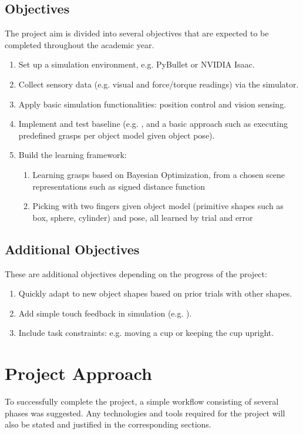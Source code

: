 \documentclass[a4paper]{report}
\theoremstyle{definition}
\begin{document}
\subsection{Objectives}
\label{sec:1.2.2}
The project aim is divided into several objectives that are expected to be completed throughout the academic year. 
\begin{enumerate}
    \item Set up a simulation environment, e.g. PyBullet or NVIDIA Isaac. 
    \item Collect sensory data (e.g. visual and force/torque readings) via the simulator.
    \item Apply basic simulation functionalities: position control and vision sensing.
    \item Implement and test baseline (e.g. \cite{breyer}, and a basic approach such as executing predefined grasps per object model given object pose).
    \item Build the learning framework:
    \begin{enumerate}
        \item Learning grasps based on Bayesian Optimization, from a chosen scene representations such as signed distance function 
        \item Picking with two fingers given object model (primitive shapes such as box, sphere, cylinder) and pose, all learned by trial and error
    \end{enumerate}
\end{enumerate}
\subsection{Additional Objectives}
These are additional objectives depending on the progress of the project:
\begin{enumerate}
    \item Quickly adapt to new object shapes based on prior trials with other shapes.
    \item Add simple touch feedback in simulation (e.g. \cite{bekiroglu}).
    \item Include task constraints: e.g. moving a cup or keeping the cup upright.
\end{enumerate}

\section{Project Approach}
\label{sec:1.3}
To successfully complete the project, a simple workflow consisting of several phases was suggested. Any technologies and tools required for the project will also be stated and justified in the corresponding sections.
\end{document}
